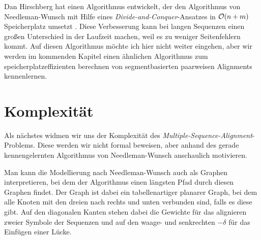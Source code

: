Dan Hirschberg hat einen Algorithmus entwickelt, der den Algorithmus von Needleman-Wunsch mit Hilfe eines \emph{Divide-and-Conquer}-Ansatzes in $\mathcal{O}(n+m)$ Speicherplatz umsetzt \citep{h75}. Diese Verbesserung kann bei langen Sequenzen einen großen Unterschied in der Laufzeit machen, weil es zu weniger Seitenfehlern kommt. Auf diesen Algorithmus möchte ich hier nicht weiter eingehen, aber wir werden im kommenden Kapitel einen ähnlichen Algorithmus zum speicherplatzeffizienten berechnen von segmentbasierten paarweisen Alignments kennenlernen.

\section{Komplexität}

Als nächstes widmen wir uns der Komplexität des \emph{Multiple-Sequence-Alignment}-Problems. Diese werden wir nicht formal beweisen, aber anhand des gerade kennengelernten Algorithmus von Needleman-Wunsch anschaulich motivieren.

Man kann die Modellierung nach Needleman-Wunsch auch als Graphen interpretieren, bei dem der Algorithmus einen längsten Pfad durch diesen Graphen findet. Der Graph ist dabei ein tabellenartiger planarer Graph, bei dem alle Knoten mit den dreien nach rechts und unten verbunden sind, falls es diese gibt. Auf den diagonalen Kanten stehen dabei die Gewichte für das alignieren zweier Symbole der Sequenzen und auf den waage- und senkrechten $-\delta$ für das Einfügen einer Lücke.

\footnotesize
\begin{center}
\end{center}
\normalsize

